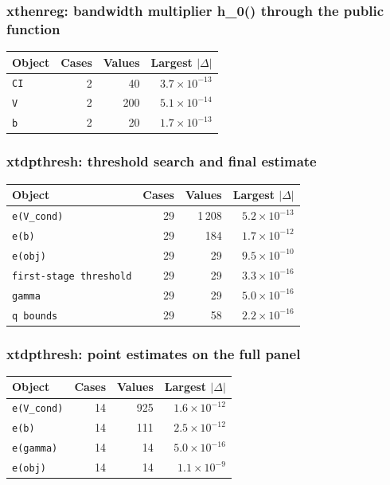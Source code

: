 \subsubsection*{xthenreg: bandwidth multiplier h\_0() through the public function}

\begin{longtable}{@{}p{8.2cm}rrr@{}}
\toprule
Object & Cases & Values & Largest $|\Delta|$ \\
\midrule
\endhead
\texttt{CI} & 2 & 40 & $3.7\times10^{-13}$ \\
\texttt{V} & 2 & 200 & $5.1\times10^{-14}$ \\
\texttt{b} & 2 & 20 & $1.7\times10^{-13}$ \\
\bottomrule
\end{longtable}

\subsubsection*{xtdpthresh: threshold search and final estimate}

\begin{longtable}{@{}p{8.2cm}rrr@{}}
\toprule
Object & Cases & Values & Largest $|\Delta|$ \\
\midrule
\endhead
\texttt{e(V\_\allowbreak{}cond)} & 29 & 1\,208 & $5.2\times10^{-13}$ \\
\texttt{e(b)} & 29 & 184 & $1.7\times10^{-12}$ \\
\texttt{e(obj)} & 29 & 29 & $9.5\times10^{-10}$ \\
\texttt{first-stage threshold} & 29 & 29 & $3.3\times10^{-16}$ \\
\texttt{gamma} & 29 & 29 & $5.0\times10^{-16}$ \\
\texttt{q bounds} & 29 & 58 & $2.2\times10^{-16}$ \\
\bottomrule
\end{longtable}

\subsubsection*{xtdpthresh: point estimates on the full panel}

\begin{longtable}{@{}p{8.2cm}rrr@{}}
\toprule
Object & Cases & Values & Largest $|\Delta|$ \\
\midrule
\endhead
\texttt{e(V\_\allowbreak{}cond)} & 14 & 925 & $1.6\times10^{-12}$ \\
\texttt{e(b)} & 14 & 111 & $2.5\times10^{-12}$ \\
\texttt{e(gamma)} & 14 & 14 & $5.0\times10^{-16}$ \\
\texttt{e(obj)} & 14 & 14 & $1.1\times10^{-9}$ \\
\bottomrule
\end{longtable}

